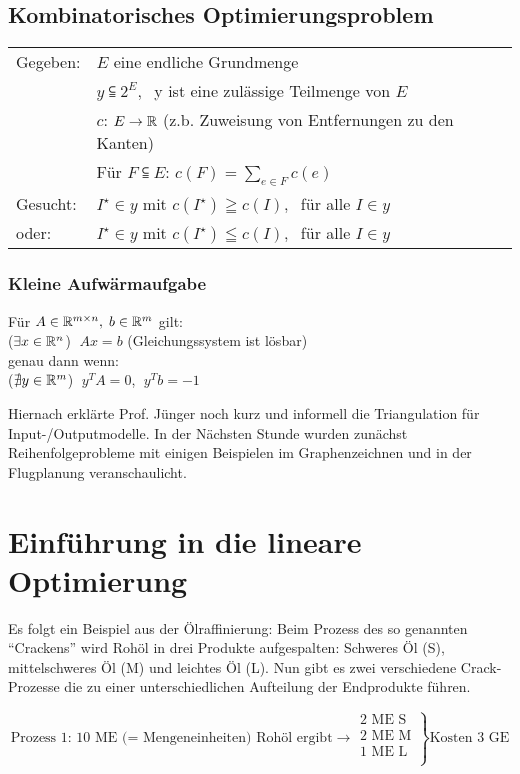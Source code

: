 \subsection{Kombinatorisches Optimierungsproblem}

\begin{tabular}{ll}
Gegeben:& $E$ eine endliche Grundmenge\\
&$y \subseteqq 2^{E},\;$ y ist eine zulässige Teilmenge von $E$\\
&$c$: $E \rightarrow \mathbb{R}$ (z.b. Zuweisung von Entfernungen zu den
Kanten)\\
&Für $F \subseteqq E$: $c(F) = \displaystyle \sum_{e\in F} c(e)$\\
Gesucht:& $I^{\star} \in  y$ mit $c(I^{\star}) \geqq c(I),\;$ für alle $I \in
 y$\\
\hspace{3mm} oder:&$I^{\star} \in  y$ mit $c(I^{\star}) \leqq c(I),\;$ für
alle $I \in  y$
\end{tabular}


\subsubsection{Kleine Aufwärmaufgabe}

Für $A \in \mathbb{R}^{m\times n}, \; b \in \mathbb{R}^{m}$ gilt:\\
($\exists x \in \mathbb{R}^{n}$) $\;A x = b$ (Gleichungssystem ist lösbar)\\
genau dann wenn:\\
($\nexists y \in \mathbb{R}^{m}$) $\;y^{T}A=0$, $\;y^{T} b=-1$

Hiernach erklärte Prof. Jünger noch kurz und informell die Triangulation
für Input-/Outputmodelle. In der Nächsten Stunde wurden zunächst 
Reihenfolgeprobleme mit einigen Beispielen im Graphenzeichnen und in der 
Flugplanung veranschaulicht.

\section{Einführung in die lineare Optimierung}

Es folgt ein Beispiel aus der Ölraffinierung: Beim Prozess des so genannten
"`Crackens"' wird Rohöl in drei Produkte aufgespalten: Schweres Öl (S),
mittelschweres Öl (M) und leichtes Öl (L). Nun gibt es zwei verschiedene
Crack-Prozesse die zu einer unterschiedlichen Aufteilung der Endprodukte
führen.

\[\mbox{Prozess 1: 10 ME (= Mengeneinheiten) Rohöl ergibt} \longrightarrow 
\left. \begin{array}{l}
\mbox{2 ME S}\\
\mbox{2 ME M}\\
\mbox{1 ME L}\\
\end{array}\right\} \mbox{Kosten 3 GE}\]

